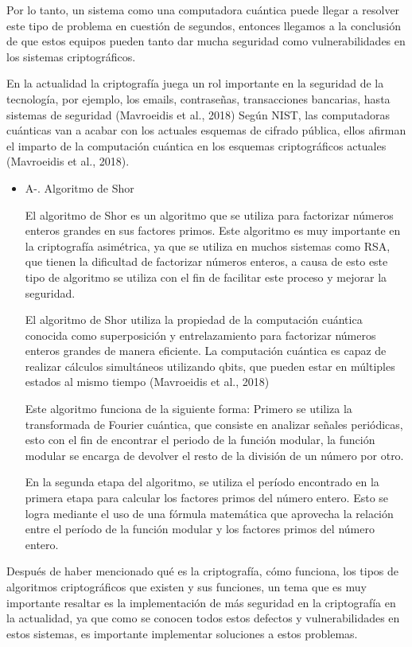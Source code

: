 \documentclass[twoside]{article}
\begin{document}
Por lo tanto, un sistema como una computadora cuántica puede llegar a resolver este tipo de problema en cuestión de segundos, entonces llegamos a la conclusión de que estos equipos pueden tanto dar mucha seguridad como vulnerabilidades en los sistemas criptográficos. 

En la actualidad la criptografía juega un rol importante en la seguridad de la tecnología, por ejemplo, los emails, contraseñas, transacciones bancarias, hasta sistemas de seguridad (Mavroeidis et al., 2018)  Según NIST, las computadoras cuánticas van a acabar con los actuales esquemas de cifrado pública, ellos afirman el imparto de la computación cuántica en los esquemas criptográficos actuales (Mavroeidis et al., 2018). 

\begin{itemize}
    \item{A}-. Algoritmo de Shor

        El algoritmo de Shor es un algoritmo que se utiliza para factorizar números enteros grandes en sus factores primos. Este algoritmo es muy importante en la criptografía asimétrica, ya que se utiliza en muchos sistemas como RSA, que tienen la dificultad de factorizar números enteros, a causa de esto este tipo de algoritmo se utiliza con el fin de facilitar este proceso y mejorar la seguridad. 

        El algoritmo de Shor utiliza la propiedad de la computación cuántica conocida como superposición y entrelazamiento para factorizar números enteros grandes de manera eficiente. La computación cuántica es capaz de realizar cálculos simultáneos utilizando qbits, que pueden estar en múltiples estados al mismo tiempo (Mavroeidis et al., 2018) 

        Este algoritmo funciona de la siguiente forma: Primero se utiliza la transformada de Fourier cuántica, que consiste en analizar señales periódicas, esto con el fin de encontrar el periodo de la función modular, la función modular se encarga de devolver el resto de la división de un número por otro. 

        En la segunda etapa del algoritmo, se utiliza el período encontrado en la primera etapa para calcular los factores primos del número entero. Esto se logra mediante el uso de una fórmula matemática que aprovecha la relación entre el período de la función modular y los factores primos del número entero. 
\end{itemize}

Después de haber mencionado qué es la criptografía, cómo funciona, los tipos de algoritmos criptográficos que existen y sus funciones, un tema que es muy importante resaltar es la implementación de más seguridad en la criptografía en la actualidad, ya que como se conocen todos estos defectos y vulnerabilidades en estos sistemas, es importante implementar soluciones a estos problemas. 
\end{document}
